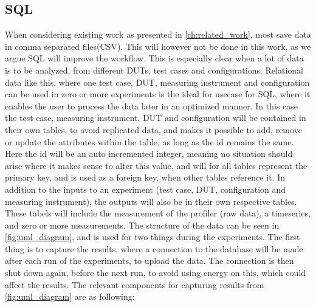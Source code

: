 \subsection{SQL}\label{subsec:sql}

When considering existing work as presented in \cref*{ch:related_work}, most save data in comma separated files(CSV)\cite*[]{Koedijk2022diff,Pereira2017}. This will however not be done in this work, as we argue SQL will improve the workflow. This is especially clear when a lot of data is to be analyzed, from different DUTs, test cases and configurations. Relational data like this, where one test case, DUT, measuring instrument and configuration can be used in zero or more experiments is the ideal for usecase for SQL, where it enables the user to process the data later in an optimized manner\cite*[]{Silberschatz2019}. In this case the test case, measuring instrument, DUT and configuration will be contained in their own tables, to avoid replicated data, and makes it possible to add, remove or update the attributes within the table, as long as the id remains the same. Here the id will be an auto incremented integer, meaning no situation should arise where it makes sense to alter this value, and will for all tables represent the primary key, and is used as a foreign key, when other tables reference it. In addition to the inputs to an experiment (test case, DUT, configuration and measuring instrument), the outputs will also be in their own respective tables. These tabels will include the measurement of the profiler (raw data), a timeseries, and zero or more measurements. The structure of the data can be seen in \cref{fig:uml_diagram}, and is used for two things during the experiments. The first thing is to capture the results, where a connection to the database will be made after each run of the experiments, to upload the data. The connection is then shut down again, before the next run, to avoid using energy on this, which could affect the results. The relevant components for capturing results from \cref*{fig:uml_diagram} are as following:

